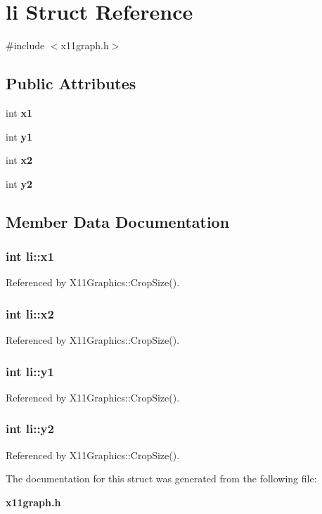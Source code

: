 \section{li Struct Reference}
\label{structli}


{\ttfamily \#include $<$x11graph.\-h$>$}

\subsection*{Public Attributes}
\begin{DoxyCompactItemize}
\item 
int {\bf x1}
\item 
int {\bf y1}
\item 
int {\bf x2}
\item 
int {\bf y2}
\end{DoxyCompactItemize}


\subsection{Member Data Documentation}
\subsubsection[{x1}]{\setlength{\rightskip}{0pt plus 5cm}int li\-::x1}\label{structli_a57c8bc45f69d7de1d3bb4df66952c09e}


Referenced by X11\-Graphics\-::\-Crop\-Size().

\subsubsection[{x2}]{\setlength{\rightskip}{0pt plus 5cm}int li\-::x2}\label{structli_a9a9bd5f6e0628029f86a6922b88c32fb}


Referenced by X11\-Graphics\-::\-Crop\-Size().

\subsubsection[{y1}]{\setlength{\rightskip}{0pt plus 5cm}int li\-::y1}\label{structli_a58ba11127ad629266e2e17de2244b615}


Referenced by X11\-Graphics\-::\-Crop\-Size().

\subsubsection[{y2}]{\setlength{\rightskip}{0pt plus 5cm}int li\-::y2}\label{structli_a43186c1e3dcafab057189d99abe65aa9}


Referenced by X11\-Graphics\-::\-Crop\-Size().



The documentation for this struct was generated from the following file\-:\begin{DoxyCompactItemize}
\item 
{\bf x11graph.\-h}\end{DoxyCompactItemize}
